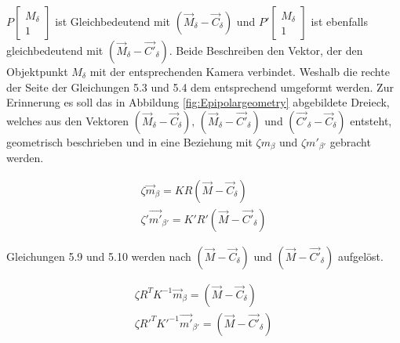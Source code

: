 $P \begin{bmatrix}
M_\delta\\1
\end{bmatrix}$ ist Gleichbedeutend mit $(\vec{M}_\delta - \vec{C}_\delta)$ und $P' \begin{bmatrix}
M_\delta\\1
\end{bmatrix}$ ist ebenfalls gleichbedeutend mit $(\vec{M}_\delta - \vec{C'}_\delta)$\cite{Elements}. Beide Beschreiben den Vektor, der den Objektpunkt $M_\delta$ mit der entsprechenden Kamera verbindet. Weshalb die rechte der Seite der Gleichungen 5.3 und 5.4 dem entsprechend umgeformt werden. Zur Erinnerung es soll das in Abbildung \ref{fig:Epipolargeometry} abgebildete Dreieck, welches aus den Vektoren $(\vec{M}_\delta - \vec{C}_\delta),\, (\vec{M}_\delta - \vec{C'}_\delta)$ und $(\vec{C'}_\delta - \vec{C}_\delta)$ entsteht, geometrisch beschrieben und in eine Beziehung mit $\zeta m_\beta$ und $\zeta m'_{\beta'}$ gebracht werden. 



\begin{gather}
\zeta\vec{m}_\beta = KR(\vec{M}-\vec{C}_\delta)\\
\zeta'\vec{m'}_{\beta'} = K'R'(\vec{M}-\vec{C'}_\delta)
\end{gather}

Gleichungen 5.9 und 5.10 werden nach $(\vec{M}-\vec{C}_\delta)$ und $(\vec{M}-\vec{C'}_\delta)$ aufgelöst.

\begin{gather}
\zeta R^TK^{-1}\vec{m}_\beta = (\vec{M}-\vec{C}_\delta)\\
\zeta R'^TK'^{-1}\vec{m'}_{\beta'} = (\vec{M}-\vec{C'}_\delta)
\end{gather}


